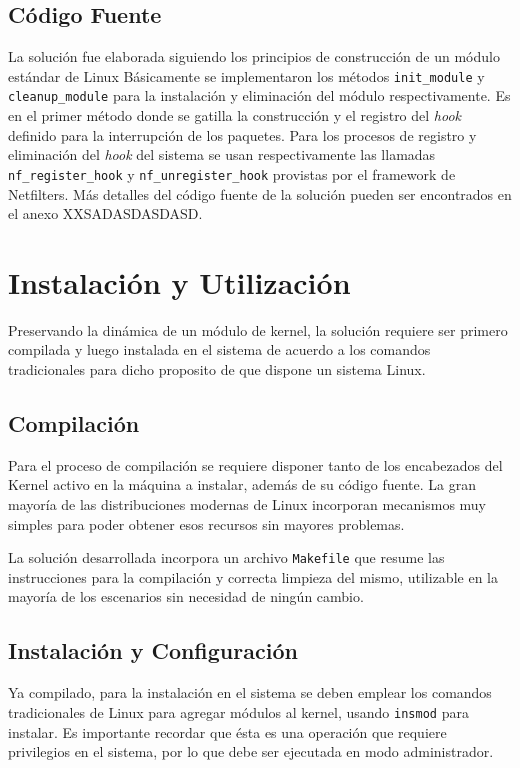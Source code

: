 \subsection{Código Fuente}
La solución fue elaborada siguiendo los principios de construcción de un módulo estándar de Linux \cite{report:netfilterModule} Básicamente se implementaron los métodos \verb=init_module= y \verb=cleanup_module= para la instalación y eliminación del módulo respectivamente. Es en el primer método donde se gatilla la construcción y el registro del \emph{hook} definido para la interrupción de los paquetes. Para los procesos de registro y eliminación del \emph{hook} del sistema se usan respectivamente las llamadas \verb=nf_register_hook= y \verb=nf_unregister_hook= provistas por el framework de Netfilters. Más detalles del código fuente de la solución pueden ser encontrados en el anexo XXSADASDASDASD.


\section{Instalación y Utilización}
Preservando la dinámica de un módulo de kernel, la solución requiere ser primero compilada y luego instalada en el sistema de acuerdo a los comandos tradicionales para dicho proposito de que dispone un sistema Linux.

\subsection{Compilación}
Para el proceso de compilación se requiere disponer tanto de los encabezados del Kernel activo en la máquina a instalar, además de su código fuente. La gran mayoría de las distribuciones modernas de Linux incorporan mecanismos muy simples para poder obtener esos recursos sin mayores problemas.

La solución desarrollada incorpora un archivo \verb=Makefile= que resume las instrucciones para la compilación y correcta limpieza del mismo, utilizable en la mayoría de los escenarios sin necesidad de ningún cambio.

\subsection{Instalación y Configuración}
Ya compilado, para la instalación en el sistema se deben emplear los comandos tradicionales de Linux para agregar módulos al kernel, usando \verb=insmod= para instalar. Es importante recordar que ésta es una operación que requiere privilegios en el sistema, por lo que debe ser ejecutada en modo administrador.

